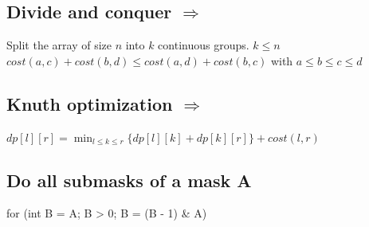 \subsection{Divide and conquer  $\Rightarrow$  } 
Split the array of size $n$ into $k$ continuous groups. $k \leq n$ \\
$cost(a, c) + cost(b, d) \leq cost(a, d) + cost(b, c)$ with $a \leq b \leq c \leq d$ \\

\subsection{Knuth optimization  $\Rightarrow$  } 
$dp[l][r] = \min_{l \leq k \leq r}\{dp[l][k] + dp[k][r]\} + cost(l, r)$ \\
\vspace{-15pt}

\subsection{Do all submasks of a mask A}
\begin{code}
for (int B = A; B > 0; B = (B - 1) & A)
\end{code}

